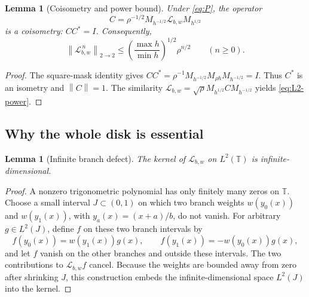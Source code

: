 \documentclass[11pt,a4paper]{article}
\newtheorem{lemma}[theorem]{Lemma}
\theoremstyle{definition}
\theoremstyle{remark}
\newcommand{\T}{\mathbb T}
\newcommand{\Lop}{\mathcal L}
\newcommand{\norm}[1]{\left\lVert#1\right\rVert}
\numberwithin{equation}{section}
\begin{document}
\begin{lemma}[Coisometry and power bound]
\label{lem:coisometry}
Under \eqref{eq:P}, the operator
\begin{equation}
 C=\rho^{-1/2}M_{h^{-1/2}}\Lop_{b,w}M_{h^{1/2}}
 \label{eq:C}
\end{equation}
is a coisometry: $CC^*=I$. Consequently,
\begin{equation}
 \norm{\Lop_{b,w}^{\,n}}_{2\to2}
 \le \left(\frac{\max h}{\min h}\right)^{1/2}\rho^{n/2}
 \qquad(n\ge0).
 \label{eq:L2-power}
\end{equation}
\end{lemma}
\begin{proof}
The square-mask identity gives
$CC^*=\rho^{-1}M_{h^{-1/2}}M_{\rho h}M_{h^{-1/2}}=I$.
Thus $C^*$ is an isometry and $\norm C=1$. The similarity
$\Lop_{b,w}=\sqrt\rho M_{h^{1/2}}CM_{h^{-1/2}}$ yields
\eqref{eq:L2-power}.
\end{proof}

\subsection{Why the whole disk is essential}
\begin{lemma}[Infinite branch defect]
\label{lem:kernel}
The kernel of $\Lop_{b,w}$ on $L^2(\T)$ is infinite-dimensional.
\end{lemma}
\begin{proof}
A nonzero trigonometric polynomial has only finitely many zeros on $\T$.
Choose a small interval $J\subset(0,1)$ on which two branch weights
$w(y_0(x))$ and $w(y_1(x))$, with $y_a(x)=(x+a)/b$, do not vanish.
For arbitrary $g\in L^2(J)$, define $f$ on these two branch intervals by
\[
 f(y_0(x))=w(y_1(x))g(x),\qquad
 f(y_1(x))=-w(y_0(x))g(x),
\]
and let $f$ vanish on the other branches and outside these intervals.
The two contributions to $\Lop_{b,w}f$ cancel. Because the weights are
bounded away from zero after shrinking $J$, this construction embeds the
infinite-dimensional space $L^2(J)$ into the kernel.
\end{proof}
\end{document}
